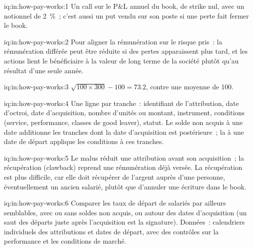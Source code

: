 \begin{solution}{iq:in:how-pay-works:1}
Un call sur le P\&L annuel du book, de strike nul, avec un notionnel de 2~\%~; c'est aussi un put vendu sur son poste si une perte
fait fermer le book.
\end{solution}

\begin{solution}{iq:in:how-pay-works:2}
Pour aligner la rémunération sur le risque pris~: la rémunération différée peut être réduite si des pertes apparaissent plus tard, et les actions lient le bénéficiaire à la
valeur de long terme de la société plutôt qu'au résultat d'une seule année.
\end{solution}

\begin{solution}{iq:in:how-pay-works:3}
$\sqrt{100\times300}-100=73.2$, contre une moyenne de 100.
\end{solution}

\begin{solution}{iq:in:how-pay-works:4}
Une ligne par tranche~: identifiant de l'attribution, date d'octroi, date d'acquisition, nombre d'unités ou montant, instrument, conditions (service, performance,
classes de good leaver), statut. Le solde non acquis à une date additionne les tranches dont la date d'acquisition est postérieure~; la  à une
date de départ applique les conditions à ces tranches.
\end{solution}

\begin{solution}{iq:in:how-pay-works:5}
Le malus réduit une attribution avant son acquisition~; la récupération (clawback) reprend une rémunération déjà versée. La récupération est plus difficile, car elle doit
récupérer de l'argent auprès d'une personne, éventuellement un ancien salarié, plutôt que d'annuler une écriture dans le book.
\end{solution}

\begin{solution}{iq:in:how-pay-works:6}
Comparer les taux de départ de salariés par ailleurs semblables, avec ou sans soldes non acquis, ou autour des dates d'acquisition (un
saut des départs juste après l'acquisition est la signature). Données~: calendriers individuels des attributions et dates de départ, avec des contrôles
sur la performance et les conditions de marché.
\end{solution}
